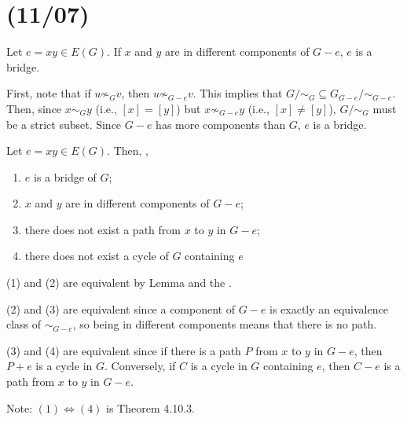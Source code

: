 \section{(11/07)}

\begin{prop}\label{prop:compbridge}
  Let $e = xy \in E(G)$.
  If $x$ and $y$ are in different components of $G-e$, $e$ is a bridge.
\end{prop}
\begin{prf}
  First, note that if $u \not\sim_G v$, then $u \not\sim_{G-e} v$.
  This implies that $G/{\sim_G} \subseteq G_{G-e}/{\sim_{G-e}}$.
  Then, since $x \sim_G y$ (i.e., $[x] = [y]$)
  but $x \not\sim_{G-e} y$ (i.e., $[x] \neq [y]$),
  $G/{\sim_G}$ must be a strict subset.
  Since $G-e$ has more components than $G$, $e$ is a bridge.
\end{prf}

\begin{theorem}[4.10.3]\label{thm:bridge}
  Let $e = xy \in E(G)$. Then, \Tfae,
  \begin{enumerate}[(1),nosep]
    \item $e$ is a bridge of $G$;
    \item $x$ and $y$ are in different components of $G-e$;
    \item there does not exist a path from $x$ to $y$ in $G-e$;
    \item there does not exist a cycle of $G$ containing $e$
  \end{enumerate}
\end{theorem}
\begin{prf}
  (1) and (2) are equivalent by Lemma 
  and the .

  (2) and (3) are equivalent since a component of $G-e$
  is exactly an equivalence class of $\sim_{G-e}$,
  so being in different components means that there is no path.

  (3) and (4) are equivalent since if there is a path $P$ from $x$ to $y$ in $G-e$,
  then $P + e$ is a cycle in $G$.
  Conversely, if $C$ is a cycle in $G$ containing $e$, then $C-e$
  is a path from $x$ to $y$ in $G-e$.

  Note: $(1) \iff (4)$ is Theorem 4.10.3.
\end{prf}


